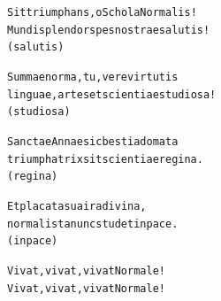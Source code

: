 \documentclass[11pt,a5paper]{article}
\newcommand{\subtitle}[1]{\vspace*{-0.8em}{\hskip 1.0cm\textcolor{gray}{\fontsize{11.5}{16}\selectfont\it #1}}\vspace*{0em}}
\newenvironment{canzone}{%
  \begin{addmargin}[1cm]{0cm}%
  \begin{alltt}\normalfont%
  }{%
  \end{alltt}%
  \end{addmargin}%
}
\begin{document}
\subtitle{\textcolor{black}{(Ogni strofa due volte)}}

\begin{canzone}
Sit triumphans, o Schola Normalis!
Mundi splendor spes nostrae salutis!
(salutis)

Summae norma, tu, vere virtutis
linguae, artes et scientiae studiosa!
(studiosa)

Sanctae Annae sic bestia domata
triumphatrix sit scientiae regina.
(regina)

Et placata sua ira divina,
normalista nunc studet in pace.
(in pace)

Vivat, vivat, vivat Normale!
Vivat, vivat, vivat Normale!
\end{canzone}
\clearpage

\end{document}
